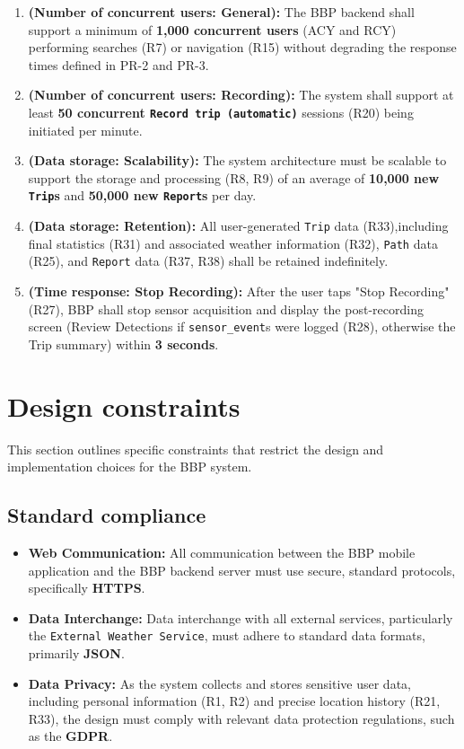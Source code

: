 \begin{enumerate}[label=\textbf{PR-\arabic*.}, leftmargin=*, itemsep=2pt]
    \item \textbf{(Number of concurrent users: General):} The BBP backend shall support a minimum of \textbf{1,000 concurrent users} (ACY and RCY) performing searches (R7) or navigation (R15) without degrading the response times defined in PR-2 and PR-3.
    
    \item \textbf{(Number of concurrent users: Recording):} The system shall support at least \textbf{50 concurrent \texttt{Record trip (automatic)}} sessions (R20) being initiated per minute.
    
    \item \textbf{(Data storage: Scalability):} The system architecture must be scalable to support the storage and processing (R8, R9) of an average of \textbf{10,000 new \texttt{Trip}s} and \textbf{50,000 new \texttt{Report}s} per day.
    
    \item \textbf{(Data storage: Retention):} All user-generated \texttt{Trip} data (R33),including final statistics (R31) and associated weather information (R32), \texttt{Path} data (R25), and \texttt{Report} data (R37, R38) shall be retained indefinitely.

    \item \textbf{(Time response: Stop Recording):} After the user taps "Stop Recording" (R27), BBP shall stop sensor acquisition and display the post-recording screen (Review Detections if \texttt{sensor\_event}s were logged (R28), otherwise the Trip summary) within \textbf{3 seconds}.
\end{enumerate}



\newpage
\section{Design constraints}
\label{sec:design_constraints}%
This section outlines specific constraints that restrict the design and implementation choices for the BBP system.

\subsection{Standard compliance}
\label{subsec:standard compliance}%
\begin{itemize}[leftmargin=*, itemsep=2pt]
    \item \textbf{Web Communication:} All communication between the BBP mobile application and the BBP backend server must use secure, standard protocols, specifically \textbf{HTTPS}.
    \item \textbf{Data Interchange:} Data interchange with all external services, particularly the \texttt{External Weather Service}, must adhere to standard data formats, primarily \textbf{JSON}.
    \item \textbf{Data Privacy:} As the system collects and stores sensitive user data, including personal information (R1, R2) and precise location history (R21, R33), the design must comply with relevant data protection regulations, such as the \textbf{GDPR}.
\end{itemize}

